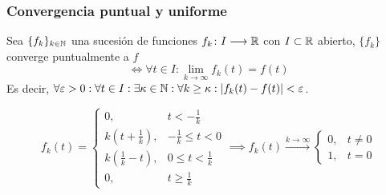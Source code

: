 \subsubsection{Convergencia puntual y uniforme}
\begin{defn}
	Sea $\{f_k\}_{k\in\mathbb{N}}$ una sucesión de funciones $f_k \colon I \longrightarrow \mathbb{R}$ con $I\subset \mathbb{R}$ abierto, $\{f_k\}$ converge puntualmente a $f$
	\[\iff \forall t\in I : \lim_{k\to\infty} f_k(t) = f(t)\]
	Es decir, $\forall \varepsilon > 0 : \forall t\in I : \exists \kappa \in \mathbb{N} : \forall k\geq \kappa : \left|f_k(t) - f(t)\right| < \varepsilon$.
\end{defn}

\begin{ejem}
	\[f_k(t) = \begin{cases}
		0, & t < -\frac{1}{k} \\
		k(t+\frac{1}{k}), & -\frac{1}{k} \leq t < 0 \\
		k(\frac{1}{k}-t), & 0\leq t < \frac{1}{k} \\
		0, & t\geq \frac{1}{k}
	\end{cases} \implies f_k(t)\xrightarrow{k\to\infty}\begin{cases}
		0, &t\ne 0 \\
		1, & t=0
	\end{cases}\]
\end{ejem}